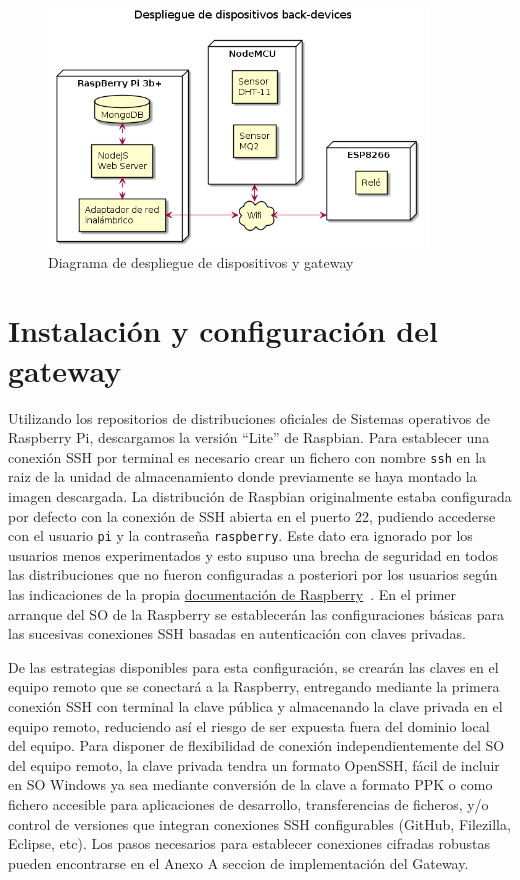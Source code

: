 \begin{figure}[hbt!]
\centering
\includegraphics[height=2.5in]{figures/diagrams/physical-devices/back-devices.png}
\caption[Diagrama de despliegue de back-end]{Diagrama de despliegue de dispositivos y gateway\footnotemark}
\end{figure}

\section{Instalación y configuración del gateway}
\label{makereference4.3}
 Utilizando los repositorios de distribuciones oficiales de Sistemas operativos de Raspberry Pi, descargamos la versión ``Lite'' de Raspbian. Para establecer una conexión SSH por terminal es necesario crear un fichero con nombre \verb|ssh| en la raiz de la unidad de almacenamiento donde previamente se haya montado la imagen descargada. La distribución de Raspbian originalmente estaba configurada por defecto con la conexión de SSH abierta en el puerto 22, pudiendo accederse con el usuario \verb|pi| y la contraseña \verb|raspberry|. Este dato era ignorado por los usuarios menos experimentados y esto supuso una brecha de seguridad en todos las distribuciones que no fueron configuradas a posteriori por los usuarios según las indicaciones de la propia \href{https://www.raspberrypi.org/documentation/configuration/security.md}{documentación de Raspberry}~\cite{securingyourraspberrypi}. En el primer arranque del SO de la Raspberry se establecerán las configuraciones básicas para las sucesivas conexiones SSH basadas en autenticación con claves privadas.

 De las estrategias disponibles para esta configuración, se crearán las claves en el equipo remoto que se conectará a la Raspberry, entregando mediante la primera conexión SSH con terminal la clave pública y almacenando la clave privada en el equipo remoto, reduciendo así el riesgo de ser expuesta fuera del dominio local del equipo. Para disponer de flexibilidad de conexión independientemente del SO del equipo remoto, la clave privada tendra un formato OpenSSH, fácil de incluir en SO Windows ya sea mediante conversión de la clave a formato PPK o como fichero accesible para aplicaciones de desarrollo, transferencias de ficheros, y/o control de versiones que integran conexiones SSH configurables (GitHub, Filezilla, Eclipse, etc). Los pasos necesarios para establecer conexiones cifradas robustas pueden encontrarse en el Anexo A seccion de implementación del Gateway.

